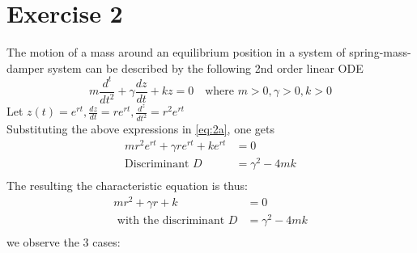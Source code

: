 \documentclass[12pt,a4paper]{article}
\begin{document}
\section*{Exercise 2}
	The motion of a mass around an equilibrium position in a system of
spring-mass-damper system can be described by the following 2nd order linear
ODE
	\begin{equation}
			m\frac{d^t}{dt^2}   + \gamma \frac{dz}{dt} + kz = 0 \quad \text{where } m > 0 , \gamma > 0, k > 0
		\label{eq:2a}
	\end{equation}
		Let $z(t)  =  e^{rt}  ,  \frac{dz}{dt}  =  re^{rt},  \frac{d^z}{dt^2}  =  r^2e^{rt}$\\
		Substituting the above expressions in \eqref{eq:2a}, one gets 
		\begin{align*}
					mr^2e^{rt} + \gamma re^{rt} + ke^{rt} &=  0\\
					\text{Discriminant } D &=  \gamma^2 -  4mk\\		
		\end{align*}
	The resulting the characteristic equation is thus:
		\begin{align*}
					mr^2 + \gamma r + k &=  0\\
					\text{ with the discriminant } D &=  \gamma^2 -  4mk\\		
		\end{align*}
		we observe the 3 cases:
\end{document}
